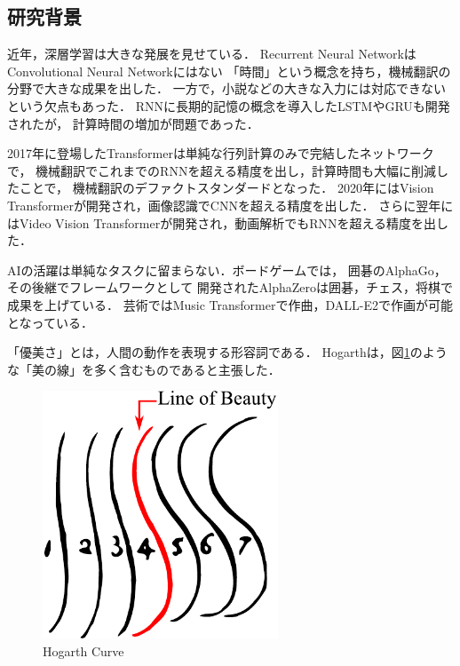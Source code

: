 \subsection{研究背景}
近年，深層学習は大きな発展を見せている．
Recurrent Neural Network\cite{rnn}はConvolutional Neural Network\cite{cnn}にはない
「時間」という概念を持ち，機械翻訳の分野で大きな成果を出した．
一方で，小説などの大きな入力には対応できないという欠点もあった．
RNNに長期的記憶の概念を導入したLSTM\cite{lstm}やGRU\cite{gru}も開発されたが，
計算時間の増加が問題であった．

2017年に登場したTransformer\cite{transformer}は単純な行列計算のみで完結したネットワークで，
機械翻訳でこれまでのRNNを超える精度を出し，計算時間も大幅に削減したことで，
機械翻訳のデファクトスタンダードとなった．
2020年にはVision Transformer\cite{vit}が開発され，画像認識でCNNを超える精度を出した．
さらに翌年にはVideo Vision Transformer\cite{vivit}が開発され，動画解析でもRNNを超える精度を出した．

AIの活躍は単純なタスクに留まらない．ボードゲームでは，
囲碁のAlphaGo\cite{alphago}，その後継でフレームワークとして
開発されたAlphaZero\cite{alphazero}は囲碁，チェス，将棋で成果を上げている．
芸術ではMusic Transformer\cite{mut}で作曲，DALL-E2\cite{dalle2}で作画が可能となっている．

「優美さ」とは，人間の動作を表現する形容詞である．
Hogarthは，図\ref{hogarth_curve}のような「美の線」を多く含むものであると主張した．

\begin{figure}[b]
  \begin{center}
   \includegraphics[width=70mm]{images/hogarth_curve.pdf}
  \end{center}
  \caption{Hogarth Curve}
  \label{hogarth_curve}
\end{figure}


